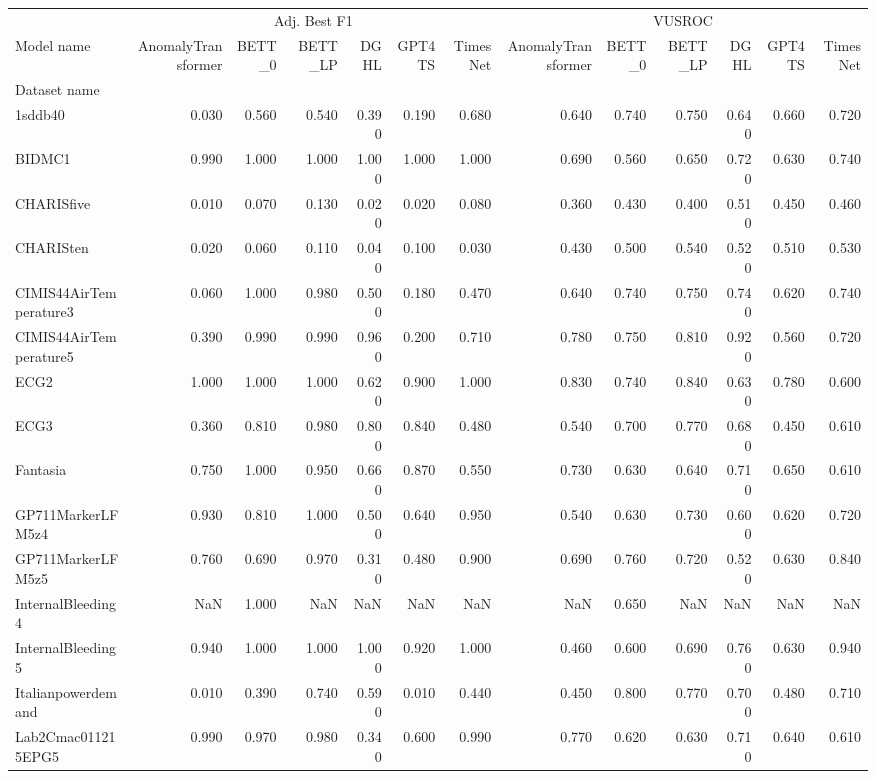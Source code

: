 \begin{tabular}{lrrrrrrrrrrrr}
\toprule
 & \multicolumn{6}{c}{Adj. Best F1} & \multicolumn{6}{c}{VUSROC} \\
Model name & AnomalyTransformer & BETT_0 & BETT_LP & DGHL & GPT4TS & TimesNet & AnomalyTransformer & BETT_0 & BETT_LP & DGHL & GPT4TS & TimesNet \\
Dataset name &  &  &  &  &  &  &  &  &  &  &  &  \\
\midrule
1sddb40 & 0.030 & 0.560 & 0.540 & 0.390 & 0.190 & 0.680 & 0.640 & 0.740 & 0.750 & 0.640 & 0.660 & 0.720 \\
BIDMC1 & 0.990 & 1.000 & 1.000 & 1.000 & 1.000 & 1.000 & 0.690 & 0.560 & 0.650 & 0.720 & 0.630 & 0.740 \\
CHARISfive & 0.010 & 0.070 & 0.130 & 0.020 & 0.020 & 0.080 & 0.360 & 0.430 & 0.400 & 0.510 & 0.450 & 0.460 \\
CHARISten & 0.020 & 0.060 & 0.110 & 0.040 & 0.100 & 0.030 & 0.430 & 0.500 & 0.540 & 0.520 & 0.510 & 0.530 \\
CIMIS44AirTemperature3 & 0.060 & 1.000 & 0.980 & 0.500 & 0.180 & 0.470 & 0.640 & 0.740 & 0.750 & 0.740 & 0.620 & 0.740 \\
CIMIS44AirTemperature5 & 0.390 & 0.990 & 0.990 & 0.960 & 0.200 & 0.710 & 0.780 & 0.750 & 0.810 & 0.920 & 0.560 & 0.720 \\
ECG2 & 1.000 & 1.000 & 1.000 & 0.620 & 0.900 & 1.000 & 0.830 & 0.740 & 0.840 & 0.630 & 0.780 & 0.600 \\
ECG3 & 0.360 & 0.810 & 0.980 & 0.800 & 0.840 & 0.480 & 0.540 & 0.700 & 0.770 & 0.680 & 0.450 & 0.610 \\
Fantasia & 0.750 & 1.000 & 0.950 & 0.660 & 0.870 & 0.550 & 0.730 & 0.630 & 0.640 & 0.710 & 0.650 & 0.610 \\
GP711MarkerLFM5z4 & 0.930 & 0.810 & 1.000 & 0.500 & 0.640 & 0.950 & 0.540 & 0.630 & 0.730 & 0.600 & 0.620 & 0.720 \\
GP711MarkerLFM5z5 & 0.760 & 0.690 & 0.970 & 0.310 & 0.480 & 0.900 & 0.690 & 0.760 & 0.720 & 0.520 & 0.630 & 0.840 \\
InternalBleeding4 & NaN & 1.000 & NaN & NaN & NaN & NaN & NaN & 0.650 & NaN & NaN & NaN & NaN \\
InternalBleeding5 & 0.940 & 1.000 & 1.000 & 1.000 & 0.920 & 1.000 & 0.460 & 0.600 & 0.690 & 0.760 & 0.630 & 0.940 \\
Italianpowerdemand & 0.010 & 0.390 & 0.740 & 0.590 & 0.010 & 0.440 & 0.450 & 0.800 & 0.770 & 0.700 & 0.480 & 0.710 \\
Lab2Cmac011215EPG5 & 0.990 & 0.970 & 0.980 & 0.340 & 0.600 & 0.990 & 0.770 & 0.620 & 0.630 & 0.710 & 0.640 & 0.610 \\

\end{tabular}
